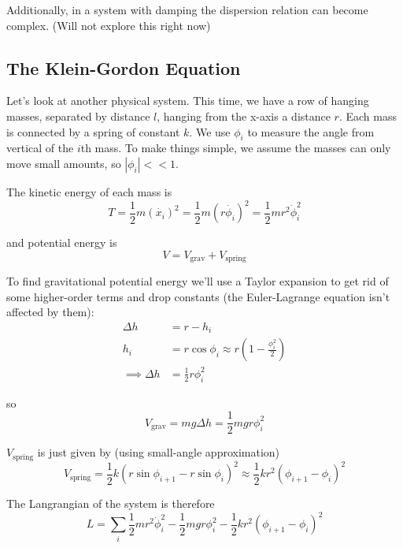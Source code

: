 \documentclass[12pt]{article}
\def\tab{\indent\hspace{15pt}}
\begin{document}
Additionally, in a system with damping the dispersion relation can become complex. (Will not explore this right now)


\subsection{The Klein-Gordon Equation}
Let's look at another physical system. This time, we have a row of hanging masses, separated by distance $l$, hanging from the x-axis a distance $r$. Each mass is connected by a spring of constant $k$. We use $\phi_i$ to measure the angle from vertical of the $i$th mass. To make things simple, we assume the masses can only move small amounts, so $|\phi_i| << 1$.

\tab The kinetic energy of each mass is
\begin{equation*}
	T = \frac{1}{2}m(\dot{x_i})^2 = \frac{1}{2}m(r\dot{\phi_i})^2 = \frac{1}{2}mr^2\dot{\phi}_i^2
\end{equation*}

and potential energy is
\begin{equation*}
	V = V_{\text{grav}} + V_{\text{spring}}
\end{equation*}

To find gravitational potential energy we'll use a Taylor expansion to get rid of some higher-order terms and drop constants (the Euler-Lagrange equation isn't affected by them):
\begin{align*}
	\Delta h &= r - h_i\\
	h_i &= r\cos\phi_i \approx r\left(1 - \frac{\phi_i^2}{2}\right)\\
	\implies \Delta h &= \frac{1}{2}r\phi_i^2
\end{align*}

so
\begin{equation*}
	V_{\text{grav}} = mg\Delta h = \frac{1}{2}mgr\phi_i^2
\end{equation*}

$V_{\text{spring}}$ is just given by (using small-angle approximation)
\begin{equation*}
	V_{\text{spring}} = \frac{1}{2}k(r\sin\phi_{i+1} - r\sin\phi_i)^2 \approx \frac{1}{2}kr^2(\phi_{i+1} - \phi_i)^2
\end{equation*}

The Langrangian of the system is therefore
\begin{equation*}
	L = \sum_i\frac{1}{2}mr^2\dot{\phi}_i^2 - \frac{1}{2}mgr\phi_i^2 - \frac{1}{2}kr^2(\phi_{i+1} - \phi_i)^2
\end{equation*}
\end{document}
